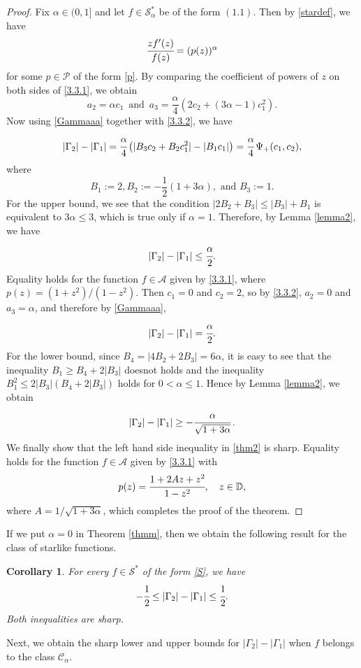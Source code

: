 \documentclass[a4paper,12pt]{amsart}
\newtheorem{corollary}[theorem]{Corollary}
\theoremstyle{definition}
\numberwithin{equation}{section}
\begin{document}
\begin{proof}
Fix $\alpha \in (0,1]$ and let $f\in \mathcal{S}^*_{\alpha}$ be of the form $(1.1)$. Then by \eqref{stardef}, we have
\begin{equation}\label{3.3.1}
\cfrac{zf'(z)}{f(z)}=(p(z))^\alpha
\end{equation}
for some $p \in \mathcal{P}$ of the form \eqref{p}. By comparing the coefficient of powers of $z$ on both sides of \eqref{3.3.1}, we obtain
	\begin{equation}\label{3.3.2}
		 a_2=\alpha c_1 \,\,\, \text{and}\,\,\,  a_3=\frac{\alpha}{4}(2c_2+(3\alpha-1)c_1^2).
	\end{equation}
\noindent Now using \eqref{Gammaaa} together with \eqref{3.3.2}, we have 
\begin{equation}\label{lambda1}
|\Gamma_2|-|\Gamma_1| = \cfrac{\alpha}{4}\left(|B_3 c_2+B_2 c
_1^2|-|B_1 c_1|\right)= \cfrac{\alpha}{4}\,\Psi_+(c_1,c_2),
\end{equation}
where  
$$
	B_1:=2, B_2:=-\frac{1}{2}(1+3\alpha), \mbox{ and } B_3:=1.
$$	
\noindent For the upper bound, we see that the condition $|2B_2+B_3| \leq |B_3|+B_1$ is equivalent
to $3 \alpha \leq 3$, which is true only if $\alpha=1$. Therefore, by Lemma \ref{lemma2},	we have
$$
|\Gamma_2|-|\Gamma_1| \leq \cfrac{\alpha}{2}.
$$
\noindent Equality holds for the function $f \in \mathcal{A}$ given by \eqref{3.3.1}, where
$p(z)=(1+z^2)/(1-z^2)$. Then $c_1=0$ and $c_2=2$, so by \eqref{3.3.2}, $a_2=0$ and $a_3=\alpha$, and therefore by \eqref{Gammaaa},
$$|\Gamma_2|-|\Gamma_1|=\cfrac{\alpha}{2}.$$
\noindent For the lower bound, since $B_4=|4B_2+2B_3|=6\alpha$, it is easy to see that the inequality $B_1 \geq B_4+2|B_3|$ doesnot holds and the inequality $B_1^2 \leq 2|B_3|(B_4+2|B_3|)$ holds for $0 < \alpha \leq 1$. Hence by Lemma \ref{lemma2}, we obtain
\begin{equation*}
|\Gamma_2|-|\Gamma_1| \geq -\cfrac{\alpha}{\sqrt{1+3\alpha}}\,.
\end{equation*}
\noindent We finally show that the left hand side inequality in \eqref{thm2} is sharp. Equality holds
for the function $f \in \mathcal{A}$ given by \eqref{3.3.1} with
$$
p(z)=\cfrac{1+2Az+z^2}{1-z^2}, \quad z \in \mathbb{D},
$$
where $A=1/\sqrt{1+3\alpha}$, which completes the proof of the theorem.
	\end{proof} 
If we put $\alpha=0$ in Theorem \ref{thmm}, then we obtain the following result for the class of starlike functions.

\begin{corollary}
	For every $f\in \mathcal{S}^*$ of the form \eqref{S}, we have
	\begin{equation}\label{C}
	-\cfrac{1}{2}\le	|\Gamma_2|-|\Gamma_1|\le \cfrac{1}{2
	}.
	\end{equation}
Both inequalities are sharp.
\end{corollary}	
\noindent Next, we obtain the sharp lower and upper bounds for $|\Gamma_2|-|\Gamma_1|$ when $f$ belongs to the class  $\mathcal{C}_{\alpha}$.	
	
\end{document}
